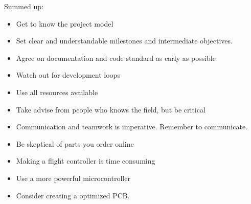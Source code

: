 Summed up:
\begin{itemize}
    \item Get to know the project model
    \item Set clear and understandable milestones and intermediate objectives. 
    \item Agree on documentation and code standard as early as possible
    \item Watch out for development loops
    \item Use all resources available
    \item Take advise from people who knows the field, but be critical
    \item Communication and teamwork is imperative. Remember to communicate.
    \item Be skeptical of parts you order online
    \item Making a flight controller is time consuming
    \item Use a more powerful microcontroller
    \item Consider creating a optimized PCB. 
\end{itemize}



